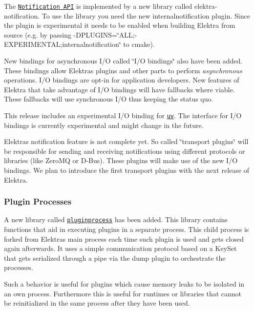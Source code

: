 The \href{https://doc.libelektra.org/api/current/html/kdbnotification_8h.html}{\tt Notification A\+PI} is implemented by a new library called {\ttfamily elektra-\/notification}. To use the library you need the new internalnotification plugin. Since the plugin is experimental it needs to be enabled when building Elektra from source (e.\+g. by passing {\ttfamily -\/\+D\+P\+L\+U\+G\+I\+NS=\char`\"{}\+A\+L\+L;-\/\+E\+X\+P\+E\+R\+I\+M\+E\+N\+T\+A\+L;internalnotification\char`\"{}} to {\ttfamily cmake}).

New bindings for asynchronous I/O called \char`\"{}\+I/\+O bindings\char`\"{} also have been added. These bindings allow Elektra\textquotesingle{}s plugins and other parts to perform {\itshape asynchronous} operations. I/O bindings are opt-\/in for application developers. New features of Elektra that take advantage of I/O bindings will have fallbacks where viable. These fallbacks will use synchronous I/O thus keeping the status quo.

This release includes an experimental I/O binding for \href{http://libuv.org/}{\tt uv}. The interface for I/O bindings is currently experimental and might change in the future.

Elektra\textquotesingle{}s notification feature is not complete yet. So called \char`\"{}transport plugins\char`\"{} will be responsible for sending and receiving notifications using different protocols or libraries (like Zero\+MQ or D-\/\+Bus). These plugins will make use of the new I/O bindings. We plan to introduce the first transport plugins with the next release of Elektra.

\subsubsection*{Plugin Processes}

A new library called \href{https://github.com/ElektraInitiative/libelektra/tree/master/src/libs/pluginprocess}{\tt pluginprocess} has been added. This library contains functions that aid in executing plugins in a separate process. This child process is forked from Elektra\textquotesingle{}s main process each time such plugin is used and gets closed again afterwards. It uses a simple communication protocol based on a Key\+Set that gets serialized through a pipe via the {\ttfamily dump} plugin to orchestrate the processes.

Such a behavior is useful for plugins which cause memory leaks to be isolated in an own process. Furthermore this is useful for runtimes or libraries that cannot be reinitialized in the same process after they have been used.

